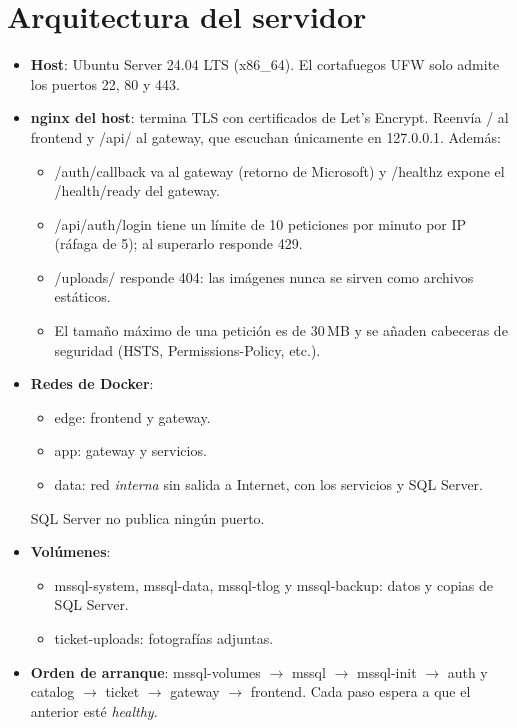 \documentclass[11pt,a4paper,oneside]{report}
\newcommand{\codus}{\textunderscore\allowbreak}
\DeclareRobustCommand{\cod}[1]{{\small\ttfamily\let\_\codus #1}}
\begin{document}
\section{Arquitectura del servidor}
\begin{itemize}
  \item \textbf{Host}: Ubuntu Server 24.04 LTS (x86\_64). El cortafuegos UFW solo admite los puertos 22, 80 y 443.
  \item \textbf{nginx del host}: termina TLS con certificados de Let's Encrypt. Reenvía \cod{/} al frontend y \cod{/api/} al gateway, que escuchan únicamente en \cod{127.0.0.1}. Además:
    \begin{itemize}
      \item \cod{/auth/callback} va al gateway (retorno de Microsoft) y \cod{/healthz} expone el \cod{/health/ready} del gateway.
      \item \cod{/api/auth/login} tiene un límite de 10 peticiones por minuto por IP (ráfaga de 5); al superarlo responde 429.
      \item \cod{/uploads/} responde 404: las imágenes nunca se sirven como archivos estáticos.
      \item El tamaño máximo de una petición es de 30\,MB y se añaden cabeceras de seguridad (HSTS, \cod{Permissions-Policy}, etc.).
    \end{itemize}
  \item \textbf{Redes de Docker}:
    \begin{itemize}
      \item \cod{edge}: frontend y gateway.
      \item \cod{app}: gateway y servicios.
      \item \cod{data}: red \emph{interna} sin salida a Internet, con los servicios y SQL Server.
    \end{itemize}
    SQL Server no publica ningún puerto.
  \item \textbf{Volúmenes}:
    \begin{itemize}
      \item \cod{mssql-system}, \cod{mssql-data}, \cod{mssql-tlog} y \cod{mssql-backup}: datos y copias de SQL Server.
      \item \cod{ticket-uploads}: fotografías adjuntas.
    \end{itemize}
  \item \textbf{Orden de arranque}: \cod{mssql-volumes} $\rightarrow$ \cod{mssql} $\rightarrow$ \cod{mssql-init} $\rightarrow$ auth y catalog $\rightarrow$ ticket $\rightarrow$ gateway $\rightarrow$ frontend. Cada paso espera a que el anterior esté \emph{healthy}.

\end{itemize}
\end{document}
